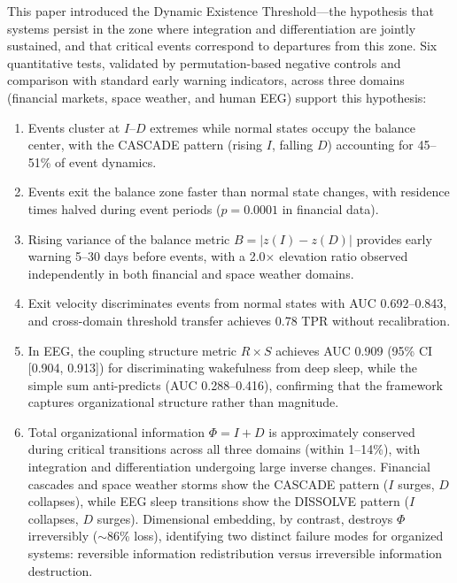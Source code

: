 \documentclass[aip,cha,reprint,amsmath,amssymb,final,floatfix]{revtex4-2}
\begin{document}
This paper introduced the Dynamic Existence Threshold---the hypothesis that systems persist in the zone where integration and differentiation are jointly sustained, and that critical events correspond to departures from this zone. Six quantitative tests, validated by permutation-based negative controls and comparison with standard early warning indicators, across three domains (financial markets, space weather, and human EEG) support this hypothesis:

\begin{enumerate}
\item Events cluster at $I$--$D$ extremes while normal states occupy the balance center, with the CASCADE pattern (rising $I$, falling $D$) accounting for 45--51\% of event dynamics.
\item Events exit the balance zone faster than normal state changes, with residence times halved during event periods ($p = 0.0001$ in financial data).
\item Rising variance of the balance metric $B = |z(I) - z(D)|$ provides early warning 5--30 days before events, with a 2.0$\times$ elevation ratio observed independently in both financial and space weather domains.
\item Exit velocity discriminates events from normal states with AUC 0.692--0.843, and cross-domain threshold transfer achieves 0.78 TPR without recalibration.
\item In EEG, the coupling structure metric $R \times S$ achieves AUC 0.909 (95\% CI [0.904, 0.913]) for discriminating wakefulness from deep sleep, while the simple sum anti-predicts (AUC 0.288--0.416), confirming that the framework captures organizational structure rather than magnitude.
\item Total organizational information $\Phi = I + D$ is approximately conserved during critical transitions across all three domains (within 1--14\%), with integration and differentiation undergoing large inverse changes. Financial cascades and space weather storms show the CASCADE pattern ($I$ surges, $D$ collapses), while EEG sleep transitions show the DISSOLVE pattern ($I$ collapses, $D$ surges). Dimensional embedding, by contrast, destroys $\Phi$ irreversibly (${\sim}86$\% loss), identifying two distinct failure modes for organized systems: reversible information redistribution versus irreversible information destruction.
\end{enumerate}
\end{document}
